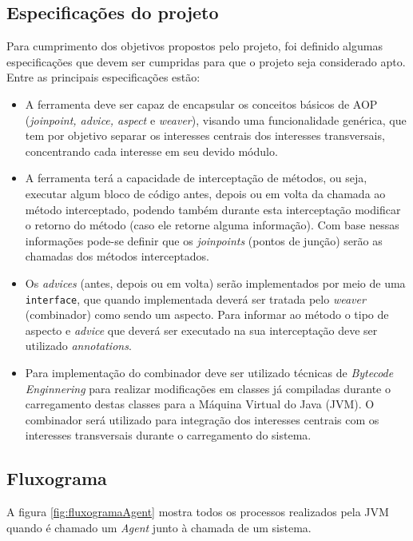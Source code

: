\documentclass[tc,oneside]{iiufrgs}
\begin{document}
\subsection{Especificações do projeto}

Para cumprimento dos objetivos propostos pelo projeto, foi definido algumas especificações que devem ser cumpridas para que o projeto seja considerado apto. Entre as principais especificações estão: 
\begin{itemize}
\item A ferramenta deve ser capaz de encapsular os conceitos básicos de AOP (\textit{joinpoint, advice, aspect} e \textit{weaver}), visando uma funcionalidade genérica, que tem por objetivo separar os interesses centrais dos interesses transversais, concentrando cada interesse em seu devido módulo.

\item A ferramenta terá a capacidade de interceptação de métodos, ou seja, executar algum bloco de código antes, depois ou em volta da chamada ao método interceptado, podendo também durante esta interceptação modificar o retorno do método (caso ele retorne alguma informação). Com base nessas informações pode-se definir que os \textit{joinpoints} (pontos de junção) serão as chamadas dos métodos interceptados.

\item Os \textit{advices} (antes, depois ou em volta) serão implementados por meio de uma \texttt{interface}, que quando implementada deverá ser tratada pelo \textit{weaver} (combinador) como sendo um aspecto. Para informar ao método o tipo de aspecto e \textit{advice} que deverá ser executado na sua interceptação deve ser utilizado \textit{annotations}.

\item Para implementação do combinador deve ser utilizado técnicas de \textit{Bytecode Enginnering} para realizar modificações em classes já compiladas durante o carregamento destas classes para a Máquina Virtual do Java (JVM). O combinador será utilizado para integração dos interesses centrais com os interesses transversais durante o carregamento do sistema.
\end{itemize}
\subsection{Fluxograma}

A figura \ref{fig:fluxogramaAgent} mostra todos os processos realizados pela JVM quando é chamado um \textit{Agent} junto à chamada de um sistema.
\end{document}

